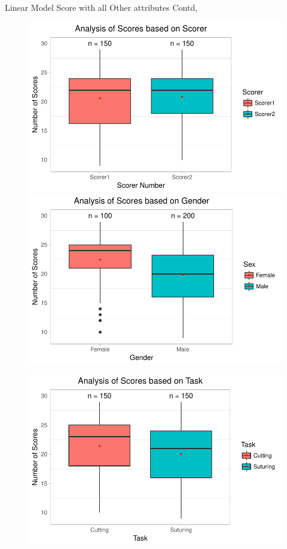\documentclass{beamer}
\begin{document}
\begin{frame}{Linear Model}{ Score with all Other attributes Contd,}
\begin{figure}
	\begin{minipage}[c]{0.4\linewidth}
	\includegraphics[width=\linewidth]{ScorerVsScore.pdf}
	\end{minipage}
	\hfill
	\begin{minipage}[c]{0.4\linewidth}
	\includegraphics[width=\linewidth]{GenderVsScore.pdf}
	\end{minipage}
\end{figure}
\begin{figure}
	\begin{minipage}[c]{0.4\linewidth}
	\includegraphics[width=\linewidth]{TaskVsScore.pdf}

\end{minipage}
\end{figure}
\end{frame}
\end{document}
